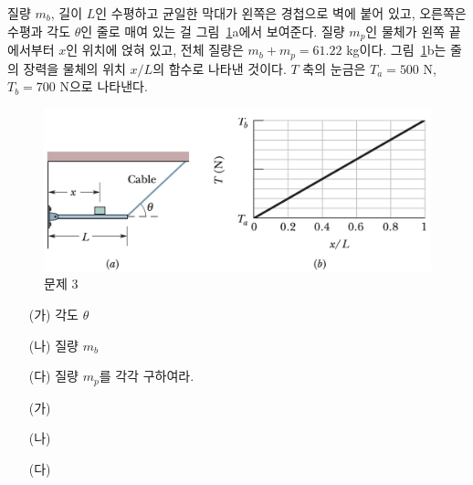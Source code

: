 \documentclass[floatfix,nofootinbib,superscriptaddress,fleqn]{revtex4-2}
\begin{document}
질량 $m_b$, 길이 $L$인 수평하고 균일한 막대가 왼쪽은 경첩으로 벽에
붙어 있고, 오른쪽은 수평과 각도 $\theta$인 줄로 매여 있는 걸
그림~\ref{fig:3}a에서 보여준다. 질량 $m_p$인 물체가 왼쪽 끝에서부터
$x$인 위치에 얹혀 있고, 전체 질량은 $m_b+m_p=61.22$
kg이다. 그림~\ref{fig:3}b는 줄의 장력을 물체의 위치 $x/L$의 함수로
나타낸 것이다. $T$ 축의 눈금은 $T_a=500$ N, $T_b=700$ N으로 나타낸다. 
\begin{figure}[ht]
  \centering
\includegraphics[scale=0.4]{Qfig15-3-20220502.png}
  \caption{문제 3}
  \label{fig:3}
\end{figure}
\begin{itemize}
\item[(가)] 각도 $\theta$
\item[(나)] 질량 $m_b$
\item[(다)] 질량 $m_p$를 각각 구하여라. 
\end{itemize}

\begin{itemize}
  \item[(가)]
  \item[(나)]
  \item[(다)]
\end{itemize}
\vspace{1.cm}

\end{document}
